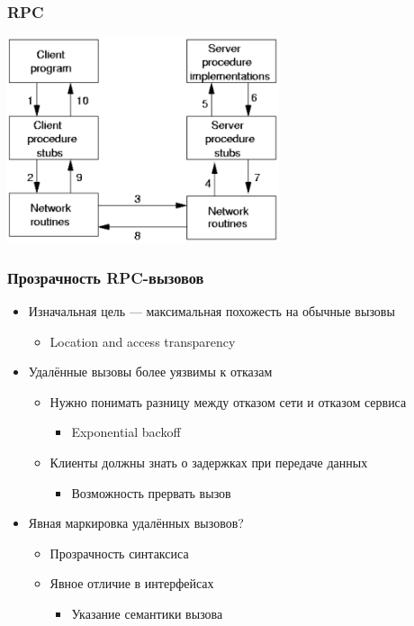 \documentclass{../../slides-style}
\begin{document}
    \begin{frame}
        \frametitle{RPC}
        \begin{center}
            \includegraphics[width=0.6\textwidth]{rpc.png}
        \end{center}
    \end{frame}

    \begin{frame}
        \frametitle{Прозрачность RPC-вызовов}
        \begin{itemize}
            \item Изначальная цель --- максимальная похожесть на обычные вызовы
            \begin{itemize}
                \item Location and access transparency
            \end{itemize}
            \item Удалённые вызовы более уязвимы к отказам
            \begin{itemize}
                \item Нужно понимать разницу между отказом сети и отказом сервиса
                \begin{itemize}
                    \item Exponential backoff
                \end{itemize}
                \item Клиенты должны знать о задержках при передаче данных
                \begin{itemize}
                    \item Возможность прервать вызов
                \end{itemize}
            \end{itemize}
            \item Явная маркировка удалённых вызовов?
            \begin{itemize}
                \item Прозрачность синтаксиса
                \item Явное отличие в интерфейсах
                \begin{itemize}
                    \item Указание семантики вызова
                \end{itemize}
            \end{itemize}
        \end{itemize}
    \end{frame}
\end{document}
